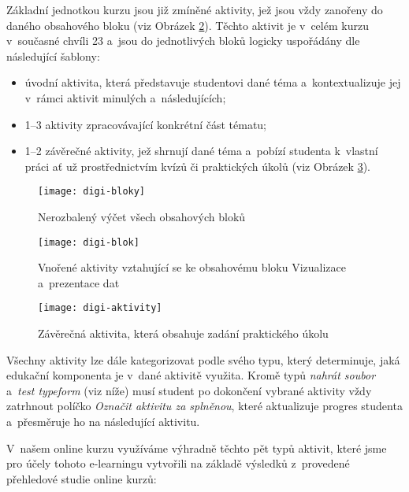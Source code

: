 Základní jednotkou kurzu jsou již zmíněné aktivity, jež jsou vždy zanořeny do daného obsahového bloku (viz Obrázek \ref{digi-blok}). Těchto aktivit je v~celém kurzu v~současné chvíli 23 a~jsou do jednotlivých bloků logicky uspořádány dle následující šablony:

\begin{itemize}
\tightlist
\item
  úvodní aktivita, která představuje studentovi dané téma a~kontextualizuje jej v~rámci aktivit minulých a~následujících;
\item
  1--3 aktivity zpracovávající konkrétní část tématu;
\item
  1--2 závěrečné aktivity, jež shrnují dané téma a~pobízí studenta k~vlastní práci ať už prostřednictvím kvízů či praktických úkolů (viz Obrázek \ref{digi-aktivity}).
\end{itemize}

\begin{figure}[h]   
    \centering
    \texttt{[image: digi-bloky]}  
    \caption{Nerozbalený výčet všech obsahových bloků}
    \label{digi-bloky}
\end{figure}

\begin{figure}[h]   
    \centering
    \texttt{[image: digi-blok]}  
    \caption{Vnořené aktivity vztahující se ke obsahovému bloku Vizualizace a~prezentace dat}
    \label{digi-blok}
\end{figure}

\begin{figure}[h]   
    \centering
    \texttt{[image: digi-aktivity]}  
    \caption{Závěrečná aktivita, která obsahuje zadání praktického úkolu}
    \label{digi-aktivity}
\end{figure}

Všechny aktivity lze dále kategorizovat podle svého typu, který determinuje, jaká edukační komponenta je v~dané aktivitě využita. Kromě typů \emph{nahrát soubor} a~\emph{test typeform} (viz níže) musí student po dokončení vybrané aktivity vždy zatrhnout políčko \emph{Označit aktivitu za splněnou}, které aktualizuje progres studenta a~přesměruje ho na následující aktivitu.

V~našem online kurzu využíváme výhradně těchto pět typů aktivit, které jsme pro účely tohoto e-learningu vytvořili na základě výsledků z~provedené přehledové studie online kurzů:

